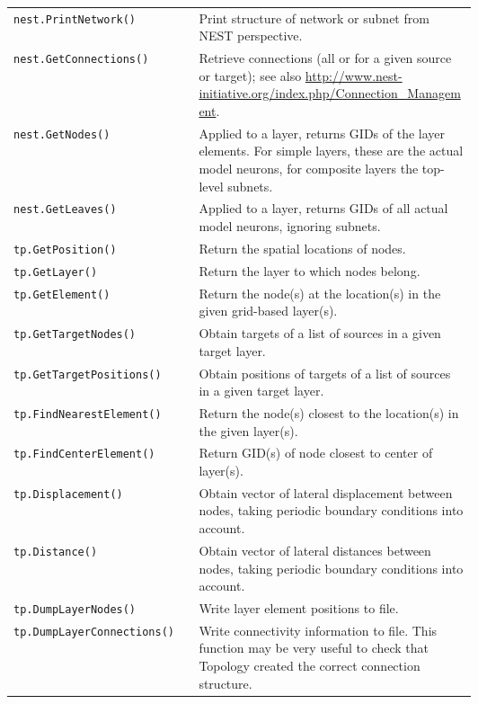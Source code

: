 \documentclass[a4paper,12pt]{report}
\begin{document}
\renewcommand{\arraystretch}{1.2}
\begin{longtable}{lp{0.6\linewidth}}
  \lstinline!nest.PrintNetwork()! & Print structure of network or
  subnet
  from NEST perspective. \\
  \lstinline!nest.GetConnections()! & Retrieve connections
  (all or for a given source or target); see also
  \url{http://www.nest-initiative.org/index.php/Connection_Management}. \\
  \lstinline!nest.GetNodes()! & Applied to a layer, returns GIDs of
  the layer elements. For simple layers, these are the actual model
  neurons,
  for composite layers the top-level subnets.\\
  \lstinline!nest.GetLeaves()! & Applied to a layer, returns GIDs of
  all
  actual model neurons, ignoring subnets.\\
  \lstinline!tp.GetPosition()!  &
  Return the spatial locations of nodes.\\
  \lstinline!tp.GetLayer()!  &
  Return the layer to which nodes belong.\\
  \lstinline!tp.GetElement()!  &
  Return the node(s) at the location(s) in the given grid-based layer(s).\\
  \lstinline!tp.GetTargetNodes()!  &
  Obtain targets of a list of sources in a given target layer.\\
  \lstinline!tp.GetTargetPositions()!  &
  Obtain positions of targets of a list of sources in a given target layer.\\
  \lstinline!tp.FindNearestElement()!  & Return the node(s) closest to
  the location(s) in the given
  layer(s).\\
  \lstinline!tp.FindCenterElement()!  &
  Return GID(s) of node closest to center of layer(s).\\
  \lstinline!tp.Displacement()!  & Obtain vector of lateral
  displacement between nodes, taking
  periodic boundary conditions into account. \\
  \lstinline!tp.Distance()!  & Obtain vector of lateral distances
  between nodes, taking periodic
  boundary conditions into account.\\
  \lstinline!tp.DumpLayerNodes()!  &
  Write layer element positions to file.\\
  \lstinline!tp.DumpLayerConnections()!  & Write connectivity
  information to file. This function may be very useful to check that
  Topology created the correct connection structure.
\end{longtable}
\end{document}
